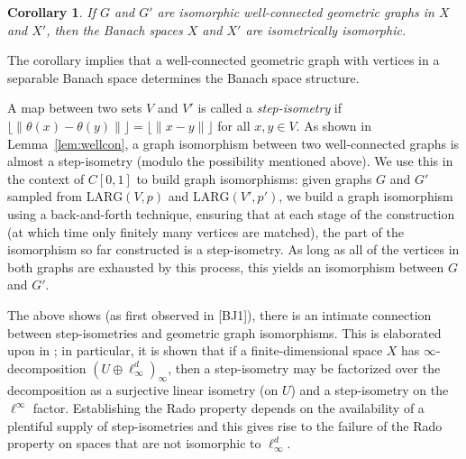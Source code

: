 \documentclass{daj}
\newtheorem{cor}[thm]{Corollary}
\newcommand{\LARG}{\mathrm{LARG}}
\begin{document}
\begin{cor}\label{cor:noniso}
If $G$ and $G'$ are isomorphic well-connected geometric graphs in $X$ and $X'$, then the Banach spaces $X$
and $X'$ are isometrically isomorphic.
\end{cor}

The corollary implies that a well-connected geometric graph with vertices in a separable Banach space
determines the Banach space structure.

A map between two sets $V$ and $V'$ is called a \emph{step-isometry} if
$\lfloor \|\theta(x)-\theta(y)\|\rfloor=
\lfloor\|x-y\|\rfloor$ for all $x,y\in V$. As shown in Lemma~\ref{lem:wellcon}, a graph isomorphism
between two well-connected graphs is almost a step-isometry (modulo the possibility mentioned above).
We use this in the context of $C[0,1]$
to build graph isomorphisms: given graphs $G$ and $G'$ sampled from $\LARG(V,p)$ and
$\LARG(V',p')$, we build a graph isomorphism using a back-and-forth technique, ensuring that at each
stage of the construction (at which time only finitely many vertices are matched), the part of the
isomorphism so far constructed is a step-isometry. As long as all of the vertices in both graphs are exhausted
by this process, this yields an isomorphism between $G$ and $G'$.

The above shows (as first observed in [BJ1]),
there is an intimate connection between
step-isometries and geometric graph isomorphisms. This is elaborated upon in \cite{BBGLW}; in particular, 
it is shown that if a finite-dimensional space $X$ has $\infty$-decomposition
$(U\oplus \ell_\infty^d)_\infty$, then a step-isometry may be factorized over the
decomposition as a surjective linear isometry (on $U$) and a step-isometry on the $\ell^\infty$
factor. Establishing the Rado property depends on the availability of a plentiful supply of
step-isometries and this gives rise to the failure of the Rado property on
spaces that are not isomorphic to $\ell_\infty^d$.
\end{document}
